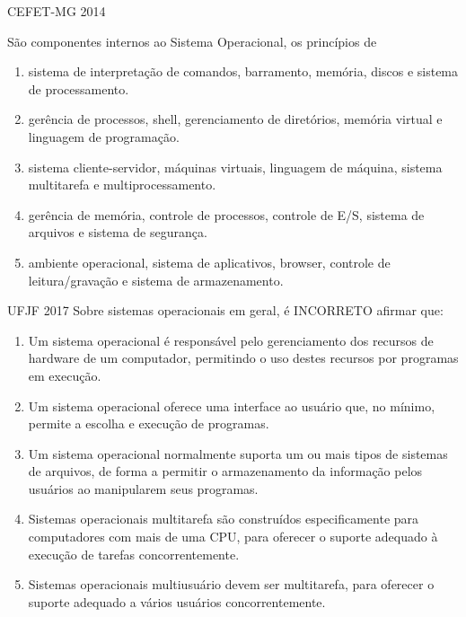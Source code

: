\documentclass[aspectratio=169,
				xcolor=table]{beamer}
\begin{document}
	\begin{frame}{CEFET-MG 2014}
		
		São componentes internos ao Sistema Operacional, os princípios de
		\begin{enumerate}[a]
			\item sistema de interpretação de comandos, barramento, memória, discos e sistema de processamento.

			\item gerência de processos, shell, gerenciamento de diretórios, memória virtual e linguagem de programação.

			\item sistema cliente-servidor, máquinas virtuais, linguagem de máquina, sistema multitarefa e multiprocessamento.

			\item \alert{gerência de memória, controle de processos, controle de E/S, sistema de arquivos e sistema de segurança.}

			\item ambiente operacional, sistema de aplicativos, browser, controle de leitura/gravação e sistema de armazenamento.

		\end{enumerate}
	\end{frame}

	\begin{frame}{UFJF 2017}
		Sobre sistemas operacionais em geral, é INCORRETO afirmar que:
		\begin{enumerate}[a]
			\small
			\item Um sistema operacional é responsável pelo gerenciamento dos recursos de hardware de um computador, permitindo o uso destes recursos por programas em execução.  

			\item Um sistema operacional oferece uma interface ao usuário que, no mínimo, permite a escolha e execução de programas. 

			\item Um sistema operacional normalmente suporta um ou mais tipos de sistemas de arquivos, de forma a permitir o armazenamento da informação pelos usuários ao manipularem seus programas.  

			\item Sistemas operacionais multitarefa são construídos especificamente para computadores com mais de uma CPU, para oferecer o suporte adequado à execução de tarefas concorrentemente. 

			\item Sistemas operacionais multiusuário devem ser multitarefa, para oferecer o suporte adequado a vários usuários concorrentemente.

		\end{enumerate}

	\end{frame}
	
\end{document}
